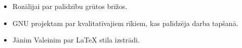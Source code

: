 \begin{itemize}
    \item Rozālijai par palīdzību grūtos brīžos.
    \item GNU projektam par kvalitatīvajiem rīkiem, kas palīdzēja darba tapšanā.
    \item Jānim Valeinim par \LaTeX{} stila izstrādi.
\end{itemize}
